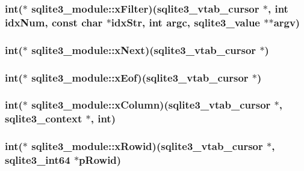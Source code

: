 \hypertarget{structsqlite3__module_1ddde32dcae461910096ebb2c42d1a6a}{
\subsubsection[xFilter]{\setlength{\rightskip}{0pt plus 5cm}int($\ast$ {\bf sqlite3\_\-module::xFilter})({\bf sqlite3\_\-vtab\_\-cursor} $\ast$, int idxNum, const char $\ast$idxStr, int argc, {\bf sqlite3\_\-value} $\ast$$\ast$argv)}}
\label{structsqlite3__module_1ddde32dcae461910096ebb2c42d1a6a}


\hypertarget{structsqlite3__module_a739d9a2081db7bf786f1f9fb9d92264}{
\subsubsection[xNext]{\setlength{\rightskip}{0pt plus 5cm}int($\ast$ {\bf sqlite3\_\-module::xNext})({\bf sqlite3\_\-vtab\_\-cursor} $\ast$)}}
\label{structsqlite3__module_a739d9a2081db7bf786f1f9fb9d92264}


\hypertarget{structsqlite3__module_e10cf7d9a7edfecf1daa34a214bf6a64}{
\subsubsection[xEof]{\setlength{\rightskip}{0pt plus 5cm}int($\ast$ {\bf sqlite3\_\-module::xEof})({\bf sqlite3\_\-vtab\_\-cursor} $\ast$)}}
\label{structsqlite3__module_e10cf7d9a7edfecf1daa34a214bf6a64}


\hypertarget{structsqlite3__module_4c82dc60335ba40c816cdd6c4dce2950}{
\subsubsection[xColumn]{\setlength{\rightskip}{0pt plus 5cm}int($\ast$ {\bf sqlite3\_\-module::xColumn})({\bf sqlite3\_\-vtab\_\-cursor} $\ast$, {\bf sqlite3\_\-context} $\ast$, int)}}
\label{structsqlite3__module_4c82dc60335ba40c816cdd6c4dce2950}


\hypertarget{structsqlite3__module_1e119b28bd3ad706d1982aaa938aac79}{
\subsubsection[xRowid]{\setlength{\rightskip}{0pt plus 5cm}int($\ast$ {\bf sqlite3\_\-module::xRowid})({\bf sqlite3\_\-vtab\_\-cursor} $\ast$, {\bf sqlite3\_\-int64} $\ast$pRowid)}}
\label{structsqlite3__module_1e119b28bd3ad706d1982aaa938aac79}


